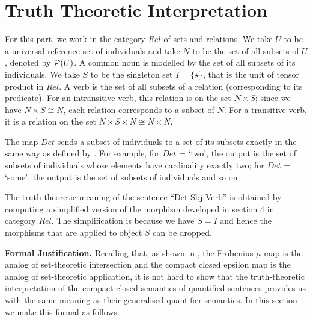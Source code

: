 \section{Truth Theoretic Interpretation}

For this part, we work in the category $Rel$ of sets and relations.  We take $U$ to be a universal reference set of individuals  and take $N$ to be the set of all  subsets of $U$, denoted by ${\cal P}(U)$. A common noun is modelled by the set of all subsets of  its individuals.    We take $S$ to be the singleton set $I = \{\star\}$, that is the unit of tensor product in $Rel$.  A verb is the set of all  subsets  of a relation (corresponding to its predicate). For an intransitive verb, this relation is on the set $N \times S$; since we have $N \times S \cong N$,  each relation corresponds to a subset of $N$.  For a transitive verb, it is a relation on the set $N \times S \times N \cong N \times N$. 



The map $Det$ sends a subset of individuals to a set of its subsets exactly in the same way as defined by \cite{BarwiseCooper81}. For example, for $Det$ = `two', the output is the set of subsets  of individuals whose elements have cardinality exactly two; for $Det$ = `some', the output is the set of  subsets of individuals and so on. 

The truth-theoretic meaning of the sentence ``Det Sbj Verb''  is obtained  by computing a simplified version of the   morphism  developed in section 4 in category $Rel$. The simplification is because we have $S = I$ and hence the morphisms that are applied to object $S$ can be dropped. 


\bigskip
\noindent
{\bf Formal Justification.} 
Recalling that, as shown in \cite{CoeckePaquettePavlovic09,CoeckePaq},  the Frobenius $ \mu$ map is the analog of  set-theoretic intersection and the compact closed  epsilon map is the analog of  set-theoretic application, it is not hard to show that  the truth-theoretic interpretation of the compact closed semantics of quantified sentences provides us with the same meaning as their generalised quantifier semantics. In this section we make this formal as follows.

